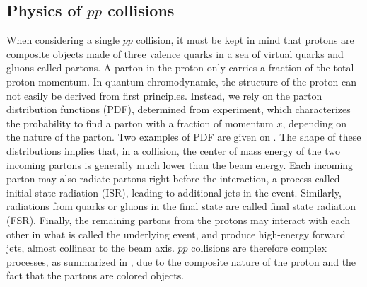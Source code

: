         \subsection{Physics of $pp$ collisions \label{sec:physicsFromCollisionsAtTheLHC}}

    When considering a single $pp$ collision, it must be kept in mind that
    protons are composite objects made of three valence quarks in a sea of
    virtual quarks and gluons called partons. A parton in the proton only
    carries a fraction of the total proton momentum. In quantum chromodynamic,
    the structure of the proton can not easily be derived from first principles.
    Instead, we rely on the parton distribution functions (PDF), determined from
    experiment, which characterizes the probability to find a parton with a
    fraction of momentum $x$, depending on the nature of the parton. Two
    examples of PDF are given on
    . The shape of these
    distributions implies that, in a collision, the center of mass energy of the
    two incoming partons is generally much lower than the beam energy.  Each
    incoming parton may also radiate partons right before the interaction, a
    process called initial state radiation (ISR), leading to additional jets in
    the event. Similarly, radiations from quarks or gluons in the final state
    are called final state radiation (FSR). Finally, the remaining partons from
    the protons may interact with each other in what is called the underlying
    event, and produce high-energy forward jets, almost collinear to the beam
    axis. $pp$ collisions are therefore complex processes, as summarized in
    , due to the composite nature of the proton and
    the fact that the partons are colored objects.



